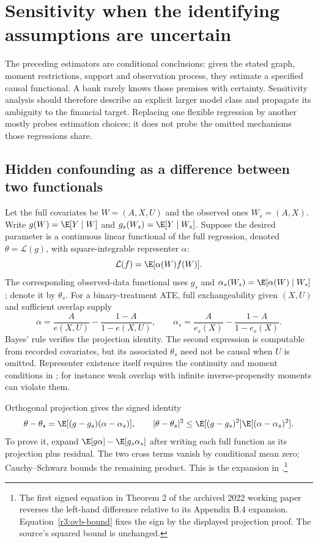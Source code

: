 \chapter{Sensitivity when the identifying assumptions are uncertain}
\label{r3:sensitivity}
The preceding estimators are conditional conclusions: given the
stated graph, moment restrictions, support and observation process,
they estimate a specified causal functional. A bank rarely knows
those premises with certainty. Sensitivity analysis should therefore
describe an explicit larger model class and propagate its ambiguity
to the financial target. Replacing one flexible regression by another
mostly probes estimation choices; it does not probe the omitted
mechanisms those regressions share.

\section{Hidden confounding as a difference between two functionals}
\label{r3:ovb-sensitivity}
Let the full covariates be $W=(A,X,U)$ and the observed ones
$W_s=(A,X)$. Write $g(W)=\E[Y\mid W]$ and
$g_s(W_s)=\E[Y\mid W_s]$. Suppose the desired parameter is a
continuous linear functional of the full regression, denoted
$\theta=\mathcal L(g)$, with square-integrable representer $\alpha$:
\[
 \mathcal L(f)=\E[\alpha(W)f(W)].
\]
The corresponding observed-data functional uses $g_s$ and
$\alpha_s(W_s)=\E[\alpha(W)\mid W_s]$; denote it by $\theta_s$.
For a binary-treatment ATE, full exchangeability given $(X,U)$ and
sufficient overlap supply
\[
 \alpha=\frac{A}{e(X,U)}-\frac{1-A}{1-e(X,U)},\qquad
 \alpha_s=\frac{A}{e_s(X)}-\frac{1-A}{1-e_s(X)}.
\]
Bayes' rule verifies the projection identity. The second expression
is computable from recorded covariates, but its associated $\theta_s$
need not be causal when $U$ is omitted. Representer existence itself
requires the continuity and moment conditions in
\citet[Assumptions 1--2 and Lemma 1]{ovb2022}; for instance weak
overlap with infinite inverse-propensity moments can violate them.

Orthogonal projection gives the signed identity
\begin{equation}
 \theta-\theta_s
    =\E[(g-g_s)(\alpha-\alpha_s)],\qquad
 |\theta-\theta_s|^2
    \le\E[(g-g_s)^2]\E[(\alpha-\alpha_s)^2].
 \label{r3:ovb-bound}
\end{equation}
To prove it, expand $\E[g\alpha]-\E[g_s\alpha_s]$ after
writing each full function as its projection plus residual.
The two cross terms vanish by conditional mean zero; Cauchy--Schwarz
bounds the remaining product. This is the expansion in
\citet[Appendix B.4]{ovb2022}.\footnote{The first signed equation
in Theorem 2 of the archived 2022 working paper reverses the
left-hand difference relative to its Appendix B.4 expansion.
Equation~\eqref{r3:ovb-bound} fixes the sign by the displayed
projection proof. The source's squared bound is unchanged.}

